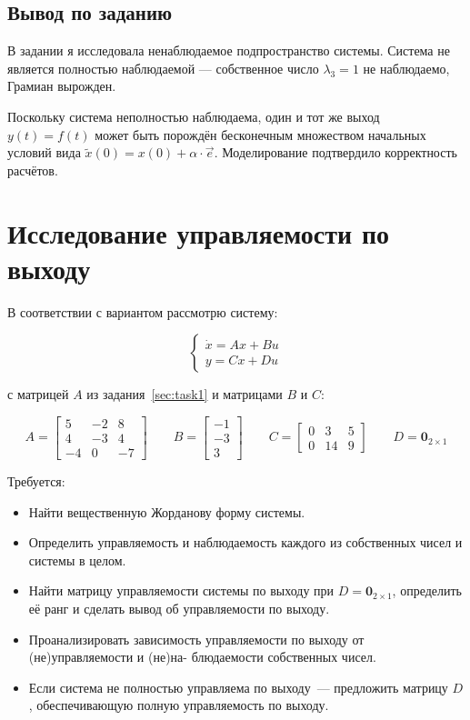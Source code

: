 \documentclass[a4paper,12pt]{article}
\begin{document}
	\newpage	
	\subsection{Вывод по заданию}
	
	В задании я исследовала ненаблюдаемое подпространство системы.
	Система не является полностью наблюдаемой --- собственное число
	$\lambda_3 = 1$ не наблюдаемо, Грамиан вырожден.
	
	Поскольку система неполностью наблюдаема, один и тот же выход
	$y(t) = f(t)$ может быть порождён бесконечным множеством начальных
	условий вида $\tilde{x}(0) = x(0) + \alpha\cdot\vec{e}$.
	Моделирование подтвердило корректность расчётов.
	
	
	\newpage
	\section{Исследование управляемости по выходу}
	
	В соответствии с вариантом рассмотрю систему:
	
	\[
	\begin{cases}
		\dot{x} = Ax + Bu \\
		y = Cx + Du
	\end{cases}
	\]
	
	с матрицей $A$ из задания~\ref{sec:task1} и матрицами $B$ и $C$:
	
	\[
	A =
	\begin{bmatrix}
		5 & -2 & 8 \\
		4 & -3 & 4 \\
		-4 & 0 & -7
	\end{bmatrix}
	\qquad
	B =
	\begin{bmatrix}
		-1 \\ -3 \\ 3
	\end{bmatrix}
	\qquad
	C =
	\begin{bmatrix}
		0 & 3 & 5 \\
		0 & 14 & 9
	\end{bmatrix}
	\qquad
	D = \mathbf{0}_{2\times 1}
	\]
	
	Требуется:
	
	\begin{itemize}
		\item Найти вещественную Жорданову форму системы.
		\item Определить управляемость и наблюдаемость каждого из 
		собственных чисел и системы в целом.
		\item Найти матрицу управляемости системы по выходу при 
		$D = \mathbf{0}_{2\times1}$, определить её ранг и сделать вывод 
		об управляемости по выходу.
		\item Проанализировать зависимость управляемости по выходу от 
		(не)управляемости и (не)на-
		блюдаемости собственных чисел.
		\item Если система не полностью управляема по выходу~--- предложить 
		матрицу $D$, обеспечивающую полную управляемость по выходу.
	\end{itemize}
	
\end{document}
